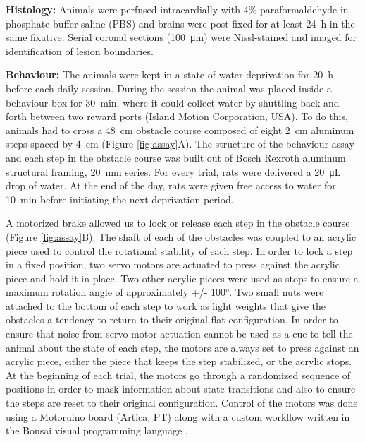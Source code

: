 \textbf{Histology:} Animals were perfused intracardially with 4\% paraformaldehyde in phosphate buffer saline (PBS) and brains were post-fixed for at least \SI{24}{\hour} in the same fixative. Serial coronal sections (\SI{100}{\micro\meter}) were Nissl-stained and imaged for identification of lesion boundaries.

\textbf{Behaviour:} The animals were kept in a state of water deprivation for \SI{20}{\hour} before each daily session. During the session the animal was placed inside a behaviour box for \SI{30}{\minute}, where it could collect water by shuttling back and forth between two reward ports (Island Motion Corporation, USA). To do this, animals had to cross a \SI{48}{\centi\meter} obstacle course composed of eight \SI{2}{\centi\meter} aluminum steps spaced by \SI{4}{\centi\meter} (Figure \ref{fig:assay}A). The structure of the behaviour assay and each step in the obstacle course was built out of Bosch Rexroth aluminum structural framing, \SI{20}{\milli\meter} series. For every trial, rats were delivered a \SI{20}{\micro\liter} drop of water. At the end of the day, rats were given free access to water for \SI{10}{\minute} before initiating the next deprivation period.

A motorized brake allowed us to lock or release each step in the obstacle course (Figure \ref{fig:assay}B). The shaft of each of the obstacles was coupled to an acrylic piece used to control the rotational stability of each step. In order to lock a step in a fixed position, two servo motors are actuated to press against the acrylic piece and hold it in place. Two other acrylic pieces were used as stops to ensure a maximum rotation angle of approximately +/- \ang{100}. Two small nuts were attached to the bottom of each step to work as light weights that give the obstacles a tendency to return to their original flat configuration. In order to ensure that noise from servo motor actuation cannot be used as a cue to tell the animal about the state of each step, the motors are always set to press against an acrylic piece, either the piece that keeps the step stabilized, or the acrylic stops. At the beginning of each trial, the motors go through a randomized sequence of positions in order to mask information about state transitions and also to ensure the steps are reset to their original configuration. Control of the motors was done using a Motoruino board (Artica, PT) along with a custom workflow written in the Bonsai visual programming language \cite{Lopes2015a}.

